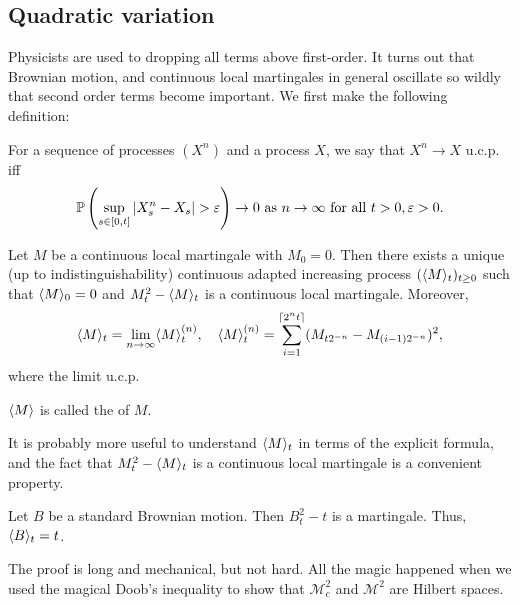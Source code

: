 \documentclass[a4paper]{article}
\begin{document}
\subsection{Quadratic variation}
Physicists are used to dropping all terms above first-order. It turns out that Brownian motion, and continuous local martingales in general oscillate so wildly that second order terms become important. We first make the following definition:
\begin{defi}
  For a sequence of processes $(X^n)$ and a process $X$, we say that $X^n \to X$ u.c.p. iff
  \[
    \P\left(\sup_{s \in [0, t]} |X_s^n - X_s| > \varepsilon\right) \to 0\text{ as }n \to \infty\text{ for all }t > 0, \varepsilon > 0.
  \]
\end{defi}

\begin{thm}
  Let $M$ be a continuous local martingale with $M_0 = 0$. Then there exists a unique (up to indistinguishability) continuous adapted increasing process $(\bra M\ket_t)_{t \geq 0}$ such that $\bra M\ket_0 = 0$ and $M_t^2 - \bra M\ket_t$ is a continuous local martingale. Moreover,
  \[
    \bra M \ket_t = \lim_{n \to \infty} \bra M\ket_t^{(n)},\quad \bra M\ket_t^{(n)} = \sum_{i = 1}^{\lceil 2^n t\rceil} (M_{t 2^{-n}} - M_{(i - 1)2^{-n}})^2,
  \]
  where the limit u.c.p.
\end{thm}
\begin{defi}
  $\bra M\ket$ is called the  of $M$.
\end{defi}
It is probably more useful to understand $\bra M\ket_t$ in terms of the explicit formula, and the fact that $M_t^2 - \bra M\ket_t$ is a continuous local martingale is a convenient property.

\begin{eg}
  Let $B$ be a standard Brownian motion. Then $B_t^2 - t$ is a martingale. Thus, $\bra B \ket_t = t$.
\end{eg}

The proof is long and mechanical, but not hard. All the magic happened when we used the magical Doob's inequality to show that $\mathcal{M}_c^2$ and $\mathcal{M}^2$ are Hilbert spaces.
\end{document}
